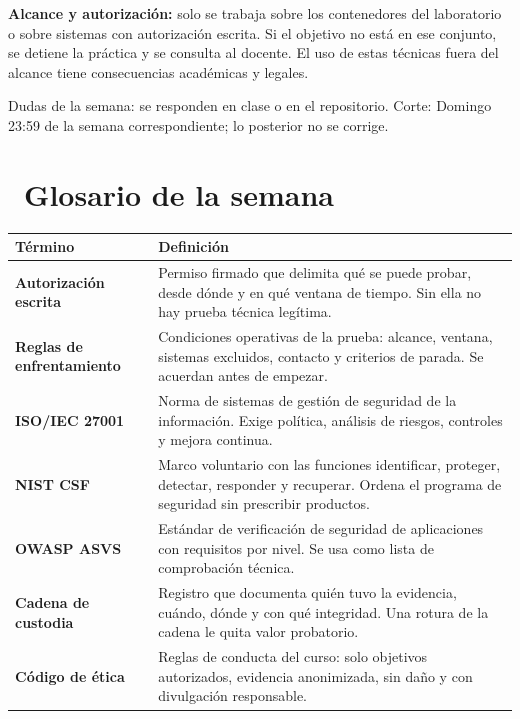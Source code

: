 \documentclass[11pt,a4paper]{article}
\newcommand{\iconotexto}[2]{\textcolor{cyanNeon}{\faIcon{#1}}~#2}
\begin{document}
\begin{tcolorbox}[cajaMejora]\textbf{Alcance y autorización:} solo se trabaja sobre los contenedores del laboratorio o sobre sistemas con autorización escrita. Si el objetivo no está en ese conjunto, se detiene la práctica y se consulta al docente. El uso de estas técnicas fuera del alcance tiene consecuencias académicas y legales.
\end{tcolorbox}

\begin{cajaRecuerda}Dudas de la semana: se responden en clase o en el repositorio. Corte: Domingo 23:59 de la semana correspondiente; lo posterior no se corrige.
\end{cajaRecuerda}

\clearpage

\section{\iconotexto{book}{Glosario de la semana}}

\small
\begin{longtable}{@{}>{\raggedright\arraybackslash}p{4.2cm}>{\raggedright\arraybackslash}p{\dimexpr\linewidth-4.2cm-12pt\relax}@{}}
\toprule
\textbf{Término} & \textbf{Definición}\\
\midrule
\endhead
\bottomrule
\endlastfoot
\textbf{Autorización escrita} & Permiso firmado que delimita qué se puede probar, desde dónde y en qué ventana de tiempo. Sin ella no hay prueba técnica legítima.\\
\textbf{Reglas de enfrentamiento} & Condiciones operativas de la prueba: alcance, ventana, sistemas excluidos, contacto y criterios de parada. Se acuerdan antes de empezar.\\
\textbf{ISO/IEC 27001} & Norma de sistemas de gestión de seguridad de la información. Exige política, análisis de riesgos, controles y mejora continua.\\
\textbf{NIST CSF} & Marco voluntario con las funciones identificar, proteger, detectar, responder y recuperar. Ordena el programa de seguridad sin prescribir productos.\\
\textbf{OWASP ASVS} & Estándar de verificación de seguridad de aplicaciones con requisitos por nivel. Se usa como lista de comprobación técnica.\\
\textbf{Cadena de custodia} & Registro que documenta quién tuvo la evidencia, cuándo, dónde y con qué integridad. Una rotura de la cadena le quita valor probatorio.\\
\textbf{Código de ética} & Reglas de conducta del curso: solo objetivos autorizados, evidencia anonimizada, sin daño y con divulgación responsable.\\
\end{longtable}
\end{document}
